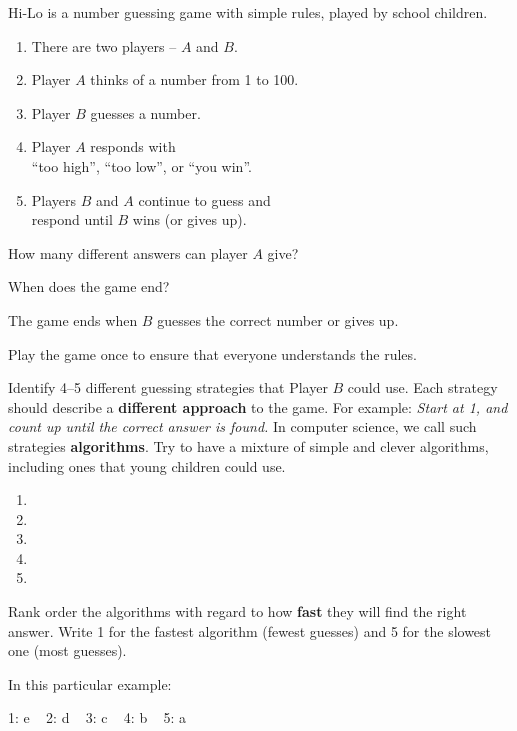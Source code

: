 
Hi-Lo is a number guessing game with simple rules, played by school children.
\begin{enumerate}[nosep]
\item There are two players -- $A$ and $B$.
\item Player $A$ thinks of a number from 1 to 100.
\item Player $B$ guesses a number.
\item Player $A$ responds with \\ ``too high'', ``too low'', or ``you win''.
\item Players $B$ and $A$ continue to guess and \\ respond until $B$ wins (or gives up).
\end{enumerate}


\Q How many different answers can player $A$ give? 

\Q When does the game end?

\begin{answer}[1em]
The game ends when $B$ guesses the correct number or gives up.
\end{answer}


\Q Play the game once to ensure that everyone understands the rules.

\Q Identify 4--5 different guessing strategies that Player $B$ could use.
Each strategy should describe a \textbf{different approach} to the game.
For example: \textit{Start at 1, and count up until the correct answer is found.}
In computer science, we call such strategies \textbf{algorithms}.
Try to have a mixture of simple and clever algorithms, including ones that young children could use.

\begin{enumerate}
\item {}
\item {}
\item {}
\item {}
\item {}
\end{enumerate}


\Q Rank order the algorithms with regard to how \textbf{fast} they will find the right answer.
Write 1 for the fastest algorithm (fewest guesses) and 5 for the slowest one (most guesses).

\begin{answer}
In this particular example:

1: e ~ 2: d ~ 3: c ~ 4: b ~ 5: a
\end{answer}
